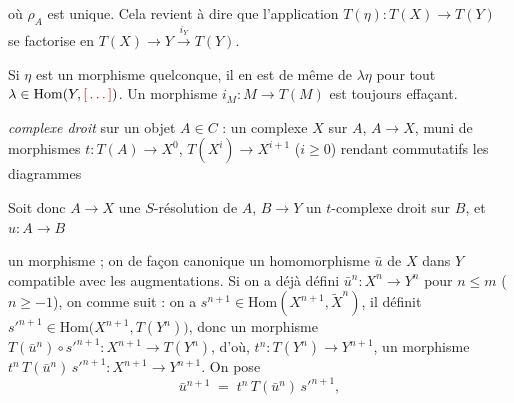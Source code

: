 \documentclass[11pt,a4paper]{article}
\begin{document}


où $\rho_A$ est \ill{} unique. Cela revient à dire que l'application
$T(\eta) : T(X) \to T(Y)$ se factorise en
$T(X) \to Y \xrightarrow{\ i_Y\ } T(Y)$.

 
Si $\eta$ est un morphisme quelconque, il en est de même de $\lambda\eta$ pour
tout $\lambda \in \mathrm{Hom}(Y, \ill{})$. Un morphisme
$i_M : M \to T(M)$ est toujours effaçant.

\ill{} \emph{complexe droit} sur un objet $A \in C$ : un complexe \ill{} $X$
sur $A$, $A \to X$, muni de morphismes $t : T(A) \to X^{0}$,
$T(X^{i}) \to X^{i+1}$ ($i \geqslant 0$) rendant commutatifs les diagrammes



 Soit donc $A \to X$ une $S$-résolution de $A$, $B \to Y$ un
$t$-complexe droit sur $B$, et $u : A \to B$

un morphisme ; on \ill{} de façon canonique un homomorphisme $\bar{u}$ de $X$
dans $Y$ compatible avec les augmentations. Si on a déjà défini
$\bar{u}^{n} : X^{n} \to Y^{n}$ pour $n \leqslant m$ ($n \geqslant -1$), on
\ill{} comme suit : on a $s^{n+1} \in \mathrm{Hom}(X^{n+1}, \widetilde{X}^{n})$,
il définit $s'^{n+1} \in \mathrm{Hom}\bigl( X^{n+1}, T(Y^{n}) \bigr)$, donc un
morphisme $T(\bar{u}^{n}) \circ s'^{n+1} : X^{n+1} \to T(Y^{n})$, d'où,
 
$t^{n} : T(Y^{n}) \to Y^{n+1}$, un morphisme
$t^{n}\, T(\bar{u}^{n})\, s'^{n+1} : X^{n+1} \to Y^{n+1}$. On pose
\[
  \bar{u}^{n+1} \;=\; t^{n}\, T(\bar{u}^{n})\, s'^{n+1} ,
\]
\end{document}
